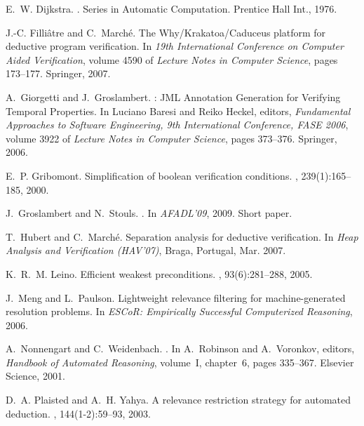 \documentclass{acm_proc_article-sp}
\theoremstyle{nonumberplain}
\begin{document}
\begin{thebibliography}{10}
E.~W. Dijkstra.
.
\newblock Series in Automatic Computation. Prentice Hall Int., 1976.

J.-C. Filli\^atre and C.~March\'e.
\newblock The {Why/Krakatoa/Caduceus} platform for deductive program
  verification.
\newblock In {\em {19th International Conference on Computer Aided
  Verification}}, volume 4590 of
\balancecolumns  
   {\em Lecture Notes in Computer Science}, pages
  173--177.
   Springer, 2007.

A.~Giorgetti and J.~Groslambert.
: {JML} {A}nnotation {G}eneration for {V}erifying {T}emporal
  {P}roperties.
\newblock In {L}uciano {B}aresi and {R}eiko {H}eckel, 
editors, {\em   {F}undamental {A}pproaches to {S}oftware
   {E}ngineering, 9th {I}nternational  {C}onference, {FASE}
   2006}, volume 3922 of {\em {L}ecture {N}otes in
  {C}omputer {S}cience}, pages 373--376. {S}pringer, 2006.

E.~P. Gribomont.
\newblock Simplification of boolean verification conditions.
, 239(1):165--185, 2000.

J.~Groslambert and N.~Stouls.
.
\newblock In {\em {AFADL'09}}, 2009.
\newblock Short paper.

T.~Hubert and C.~March\'e.
\newblock Separation analysis for deductive verification.
\newblock In {\em Heap Analysis and Verification (HAV'07)}, Braga, Portugal,
  Mar. 2007.

K.~R.~M. Leino.
\newblock Efficient weakest preconditions.
, 93(6):281--288, 2005.

J.~Meng and L.~Paulson.
\newblock Lightweight relevance filtering for machine-generated resolution
  problems.
\newblock In {\em ESCoR: Empirically Successful Computerized Reasoning}, 2006.

A.~Nonnengart and C.~Weidenbach.
.
\newblock In A.~Robinson and A.~Voronkov, editors, {\em Handbook of Automated
  Reasoning}, volume~I, chapter~6, pages 335--367. Elsevier Science, 2001.

D.~A. Plaisted and A.~H. Yahya.
\newblock A relevance restriction strategy for automated deduction.
, 144(1-2):59--93, 2003.


\end{thebibliography}
\end{document}

